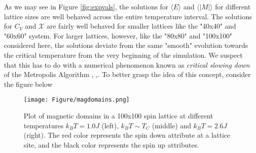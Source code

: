 As we may see in Figure \ref{fig:expvals}, the solutions for $\langle E \rangle$ and $\langle |M| \rangle$ for different lattice sizes are well behaved across the entire temperature interval. The solutions for $C_V$ and $\mathcal{X}$ are fairly well behaved for smaller lattices like the "40x40" and "60x60" system. For larger lattices, however, like the "80x80" and "100x100" considered here, the solutions deviate from the same "smooth" evolution towards the critical temperature from the very beginning of the simulation. We suspect that this has to do with a numerical phenomenon known as \textit{critical slowing down} of the Metropolis Algorithm \cite{walter}, \cite{carlon},\cite{gould}. To better grasp the idea of this concept, consider the figure below

\begin{figure}[H]
    \centering
    \texttt{[image: Figure/magdomains.png]}
    \caption{Plot of magnetic domains in a 100x100 spin lattice at different temperatures $k_B T = 1.0 J$ (left), $k_B T \sim T_C$ (middle) and $k_B T = 2.6 J$ (right). The red color represents the spin down attribute at a lattice site, and the black color represents the spin up attributes. }
    \label{fig:domains}
\end{figure}

